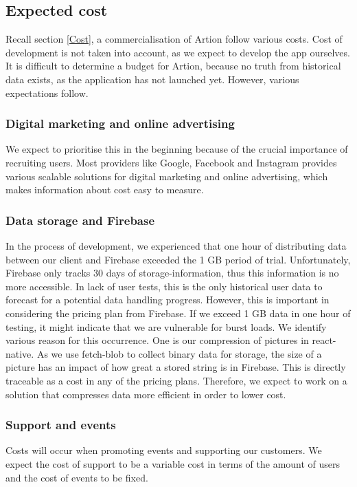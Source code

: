 \subsection{Expected cost}
Recall section \ref{Cost}, a commercialisation of Artion follow various costs. Cost of development is not taken into account, as we expect to develop the app ourselves. It is difficult to determine a budget for Artion, because no truth from historical data exists, as the application has not launched yet. However, various expectations follow.

\subsubsection{Digital marketing and online advertising}
We expect to prioritise this in the beginning because of the crucial importance of recruiting users. Most providers like Google, Facebook and Instagram provides various scalable solutions for digital marketing and online advertising, which makes information about cost easy to measure.

\subsubsection{Data storage and Firebase}
In the process of development, we experienced that one hour of distributing data between our client and Firebase exceeded the 1 GB period of trial. Unfortunately, Firebase only tracks 30 days of storage-information, thus this information is no more accessible. In lack of user tests, this is the only historical user data to forecast for a potential data handling progress. However, this is important in considering the pricing plan from Firebase. If we exceed 1 GB data in one hour of testing, it might indicate that we are vulnerable for burst loads. We identify various reason for this occurrence. One is our compression of pictures in react-native. As we use fetch-blob to collect binary data for storage, the size of a picture has an impact of how great a stored string is in Firebase. This is directly traceable as a cost in any of the pricing plans. Therefore, we expect to work on a solution that compresses data more efficient in order to lower cost.
\subsubsection{Support and events}
Costs will occur when promoting events and supporting our customers. We expect the cost of support to be a variable cost in terms of the amount of users and the cost of events to be fixed.


